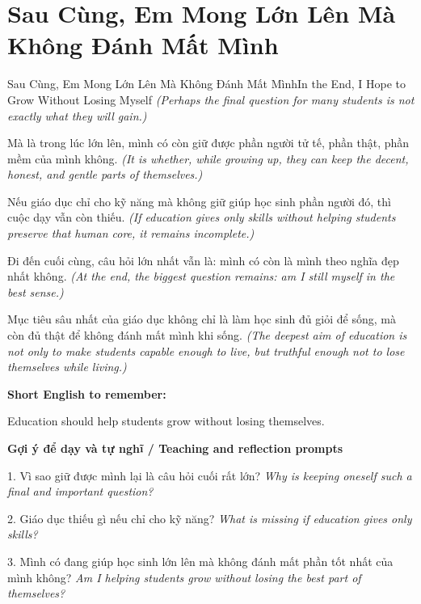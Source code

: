 \section{Sau Cùng, Em Mong Lớn Lên Mà Không Đánh Mất Mình}
\begin{truyen}{Sau Cùng, Em Mong Lớn Lên Mà Không Đánh Mất Mình}{In the End, I Hope to Grow Without Losing Myself}
\textit{(Perhaps the final question for many students is not exactly what they will gain.)}

Mà là trong lúc lớn lên, mình có còn giữ được phần người tử tế, phần thật, phần mềm của mình không.
\textit{(It is whether, while growing up, they can keep the decent, honest, and gentle parts of themselves.)}

Nếu giáo dục chỉ cho kỹ năng mà không giữ giúp học sinh phần người đó, thì cuộc dạy vẫn còn thiếu.
\textit{(If education gives only skills without helping students preserve that human core, it remains incomplete.)}

Đi đến cuối cùng, câu hỏi lớn nhất vẫn là: mình có còn là mình theo nghĩa đẹp nhất không.
\textit{(At the end, the biggest question remains: am I still myself in the best sense.)}

\end{truyen}

\begin{baihoc}
Mục tiêu sâu nhất của giáo dục không chỉ là làm học sinh đủ giỏi để sống, mà còn đủ thật để không đánh mất mình khi sống.
\textit{(The deepest aim of education is not only to make students capable enough to live, but truthful enough not to lose themselves while living.)}
\end{baihoc}

\begin{ghinhoanh}
\textbf{Short English to remember:}

Education should help students grow without losing themselves.

\end{ghinhoanh}

\begin{tuhocnhanh}
\textbf{Gợi ý để dạy và tự nghĩ / Teaching and reflection prompts}

1. Vì sao giữ được mình lại là câu hỏi cuối rất lớn? \textit{Why is keeping oneself such a final and important question?}

2. Giáo dục thiếu gì nếu chỉ cho kỹ năng? \textit{What is missing if education gives only skills?}

3. Mình có đang giúp học sinh lớn lên mà không đánh mất phần tốt nhất của mình không? \textit{Am I helping students grow without losing the best part of themselves?}
\end{tuhocnhanh}
